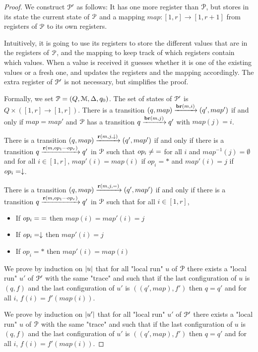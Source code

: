 \begin{proof}
	
	We construct $\mathcal{P}'$ as follows: It has one more register than $\mathcal{P}$, but stores in its state the current state of $\mathcal{P}$ and a mapping $map : [1,r] \to [1,r+1]$ from registers of $\mathcal{P}$ to its own registers.
	
	Intuitively, it is going to use its registers to store the different values that are in the registers of $\mathcal{P}$, and the mapping to keep track of which registers contain which values.
	When a value is received it guesses whether it is one of the existing values or a fresh one, and updates the registers and the mapping accordingly.
	The extra register of $\mathcal{P}'$ is not necessary, but simplifies the proof.
	
	Formally, we set $\mathcal{P} = (Q, \mathcal{M}, \Delta, q_0)$. The set of states of $\mathcal{P}'$ is $Q \times ([1,r] \to [1,r])$. 
	There is a transition $(q, map) \xrightarrow{\textbf{br}(m, i)} (q', map')$ if and only if $map = map'$ and $\mathcal{P}$ has a transition $q \xrightarrow{\textbf{br}(m, j)} q'$ with $map(j) = i$.
	
	There is a transition $(q, map) \xrightarrow{\textbf{r}(m, j, \downarrow)} (q', map')$ if and only if there is a transition $q \xrightarrow{\textbf{r}(m, op_1\cdots op_r)} q'$ in $\mathcal{P}$ such that $op_i \neq {=}$ for all $i$ and $map^{-1}(j) =\emptyset$ and for all $i \in [1,r]$, $map'(i) = map(i)$ if $op_i = *$ and $map'(i) = j$ if $op_i = \downarrow$.
	
	There is a transition $(q, map) \xrightarrow{\textbf{r}(m, j, {=})} (q', map')$ if and only if there is a transition $q \xrightarrow{\textbf{r}(m, op_1\cdots op_r)} q'$ in $\mathcal{P}$ such that for all $i\in [1,r]$,
	\begin{itemize}
		\item If $op_i = {=}$ then $map(i) = map'(i) = j$
		
		\item If $op_i = \downarrow$ then $map'(i) = j$
		
		\item If $op_i = *$ then $map'(i)= map(i)$
	\end{itemize}
	
	
	We prove by induction on $|u|$ that for all "local run" $u$ of $\mathcal{P}$ there exists a "local run" $u'$ of $\mathcal{P}'$ with the same "trace" and such that if the last configuration of $u$ is $(q,f)$ and the last configuration of $u'$ is $((q',map), f')$ then $q=q'$ and for all $i$, $f(i) = f'(map(i))$.  
	
	
	We prove by induction on $|u'|$ that for all "local run" $u'$ of $\mathcal{P}'$ there exists a "local run" $u$ of $\mathcal{P}$ with the same "trace" and such that if the last configuration of $u$ is $(q,f)$ and the last configuration of $u'$ is $((q',map), f')$ then $q=q'$ and for all $i$, $f(i) = f'(map(i))$.
	
\end{proof}

